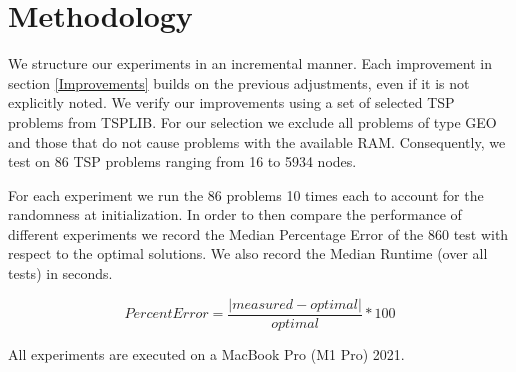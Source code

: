 \section{Methodology}
We structure our experiments in an incremental manner. Each improvement in section \ref{Improvements} builds on the previous adjustments, even if it is not explicitly noted. We verify our improvements using a set of selected TSP problems from TSPLIB. For our selection we exclude all problems of type GEO and those that do not cause problems with the available RAM. Consequently, we test on 86 TSP problems ranging from 16 to 5934 nodes.


For each experiment we run the 86 problems 10 times each to account for the randomness at initialization. In order to then compare the performance of different experiments we record the Median Percentage Error of the 860 test with respect to the optimal solutions. We also record the Median Runtime (over all tests) in seconds.

\begin{equation}
Percent Error= \frac{\lvert measured - optimal\rvert}{optimal}*100
\end{equation}

All experiments are executed on a MacBook Pro (M1 Pro) 2021.